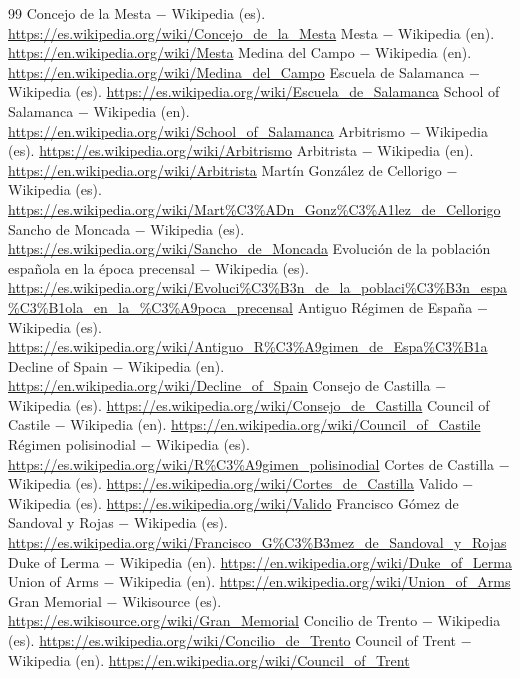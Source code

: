 \documentclass{book}
\begin{document}
\begin{thebibliography}{99}
 Concejo de la Mesta \(-\) Wikipedia (es). \url{https://es.wikipedia.org/wiki/Concejo_de_la_Mesta}
 Mesta \(-\) Wikipedia (en). \url{https://en.wikipedia.org/wiki/Mesta}
 Medina del Campo \(-\) Wikipedia (en). \url{https://en.wikipedia.org/wiki/Medina_del_Campo}
 Escuela de Salamanca \(-\) Wikipedia (es). \url{https://es.wikipedia.org/wiki/Escuela_de_Salamanca}
 School of Salamanca \(-\) Wikipedia (en). \url{https://en.wikipedia.org/wiki/School_of_Salamanca}
 Arbitrismo \(-\) Wikipedia (es). \url{https://es.wikipedia.org/wiki/Arbitrismo}
 Arbitrista \(-\) Wikipedia (en). \url{https://en.wikipedia.org/wiki/Arbitrista}
 Martín González de Cellorigo \(-\) Wikipedia (es). \url{https://es.wikipedia.org/wiki/Mart%C3%ADn_Gonz%C3%A1lez_de_Cellorigo}
 Sancho de Moncada \(-\) Wikipedia (es). \url{https://es.wikipedia.org/wiki/Sancho_de_Moncada}
 Evolución de la población española en la época precensal \(-\) Wikipedia (es). \url{https://es.wikipedia.org/wiki/Evoluci%C3%B3n_de_la_poblaci%C3%B3n_espa%C3%B1ola_en_la_%C3%A9poca_precensal}
 Antiguo Régimen de España \(-\) Wikipedia (es). \url{https://es.wikipedia.org/wiki/Antiguo_R%C3%A9gimen_de_Espa%C3%B1a}
 Decline of Spain \(-\) Wikipedia (en). \url{https://en.wikipedia.org/wiki/Decline_of_Spain}
 Consejo de Castilla \(-\) Wikipedia (es). \url{https://es.wikipedia.org/wiki/Consejo_de_Castilla}
 Council of Castile \(-\) Wikipedia (en). \url{https://en.wikipedia.org/wiki/Council_of_Castile}
 Régimen polisinodial \(-\) Wikipedia (es). \url{https://es.wikipedia.org/wiki/R%C3%A9gimen_polisinodial}
 Cortes de Castilla \(-\) Wikipedia (es). \url{https://es.wikipedia.org/wiki/Cortes_de_Castilla}
 Valido \(-\) Wikipedia (es). \url{https://es.wikipedia.org/wiki/Valido}
 Francisco Gómez de Sandoval y Rojas \(-\) Wikipedia (es). \url{https://es.wikipedia.org/wiki/Francisco_G%C3%B3mez_de_Sandoval_y_Rojas}
 Duke of Lerma \(-\) Wikipedia (en). \url{https://en.wikipedia.org/wiki/Duke_of_Lerma}
 Union of Arms \(-\) Wikipedia (en). \url{https://en.wikipedia.org/wiki/Union_of_Arms}
 Gran Memorial \(-\) Wikisource (es). \url{https://es.wikisource.org/wiki/Gran_Memorial}
 Concilio de Trento \(-\) Wikipedia (es). \url{https://es.wikipedia.org/wiki/Concilio_de_Trento}
 Council of Trent \(-\) Wikipedia (en). \url{https://en.wikipedia.org/wiki/Council_of_Trent}

\end{thebibliography}
\end{document}
